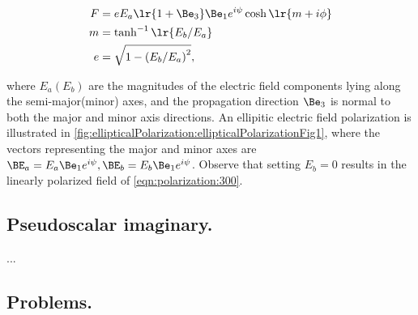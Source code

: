 \begin{dmath}\label{eqn:ellipticalWaves:380}
\begin{aligned}
F &= e E_a \lr{ 1 + \Be_3 } \Be_1 e^{ i \psi } \cosh\lr{ m + i \phi} \\
m &= \tanh^{-1}\lr{ E_b/E_a } \\
e &= \sqrt{1 - {(E_b/E_a)}^2 },
\end{aligned}
\end{dmath}

where \( E_a(E_b) \) are the magnitudes of the electric field components lying along the semi-major(minor) axes, and the propagation direction \( \Be_3 \) is normal to both the major and minor axis directions.  
An ellipitic electric field polarization is illustrated in \cref{fig:ellipticalPolarization:ellipticalPolarizationFig1}, where the vectors representing the major and minor axes are \( \BE_a = E_a \Be_1 e^{i\psi}, \BE_b = E_b \Be_1 e^{i\psi} \).
Observe that setting \( E_b = 0 \) results in the linearly polarized field of \cref{eqn:polarization:300}.

\subsection{Pseudoscalar imaginary.}

...

\subsection{Problems.}


